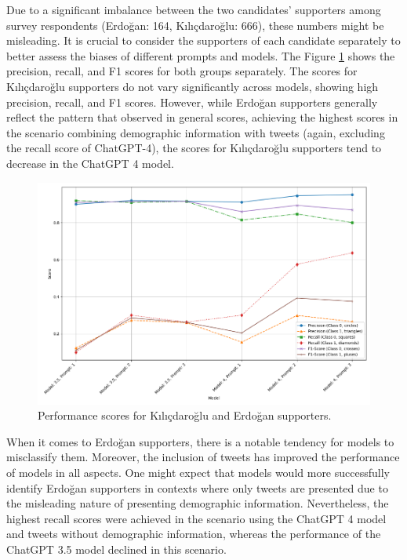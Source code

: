\documentclass[sigconf,natbib=false]{acmart}
\begin{document}
Due to a significant imbalance between the two candidates' supporters among survey respondents (Erdoğan: 164, Kılıçdaroğlu: 666), these numbers might be misleading. It is crucial to consider the supporters of each candidate separately to better assess the biases of different prompts and models. The Figure \ref{fig:graph2} shows the precision, recall, and F1 scores for both groups separately. The scores for Kılıçdaroğlu supporters do not vary significantly across models, showing high precision, recall, and F1 scores. However, while Erdoğan supporters generally reflect the pattern that observed in general scores, achieving the highest scores in the scenario combining demographic information with tweets (again, excluding the recall score of ChatGPT-4), the scores for Kılıçdaroğlu supporters tend to decrease in the ChatGPT 4 model.

\begin{figure}[ht]
  \centering
  \includegraphics[width=\linewidth]{graph2.png}
  \caption{Performance scores for Kılıçdaroğlu and Erdoğan supporters.}
   \label{fig:graph2}
\end{figure}

When it comes to Erdoğan supporters, there is a notable tendency for models to misclassify them. Moreover, the inclusion of tweets has improved the performance of models in all aspects. One might expect that models would more successfully identify Erdoğan supporters in contexts where only tweets are presented due to the misleading nature of presenting demographic information. Nevertheless, the highest recall scores were achieved in the scenario using the ChatGPT 4 model and tweets without demographic information, whereas the performance of the ChatGPT 3.5 model declined in this scenario.
\end{document}
